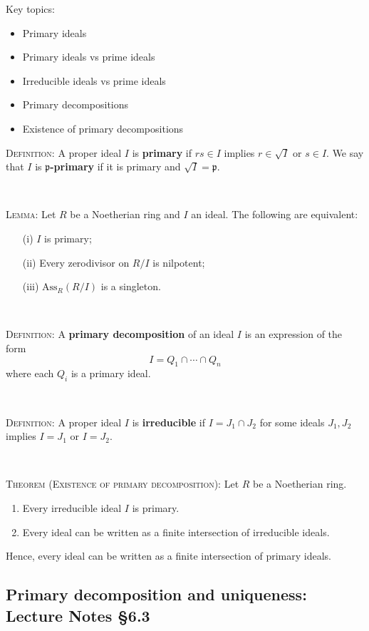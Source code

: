 \documentclass[12pt]{amsart}
\newcommand{\p}{\mathfrak{p}}
\newcommand{\Ass}{\mathrm{Ass}}
\newcommand{\0}{$\phantom{.}$}
\newcommand{\1}{\mathbbm{1}}
\begin{document}
  \begin{framed} Key topics:
\begin{itemize}
\item Primary ideals
\item Primary ideals vs prime ideals
\item Irreducible ideals vs prime ideals
\item Primary decompositions
\item Existence of primary decompositions
\end{itemize}
\end{framed}

\noindent \textsc{Definition:} A proper ideal $I$ is \textbf{primary} if $rs\in I$ implies $r\in \sqrt{I}$ or $s\in I$. We say that $I$ is \textbf{$\p$-primary} if it is primary and $\sqrt{I}=\p$.

\

\noindent \textsc{Lemma:} Let $R$ be a Noetherian ring and $I$ an ideal. The following are equivalent:
\begin{enumerate}
\item[(i)] $I$ is primary;
\item[(ii)] Every zerodivisor on $R/I$ is nilpotent;
\item[(iii)] $\Ass_R(R/I)$ is a singleton.
\end{enumerate}

\


\noindent \textsc{Definition:} A \textbf{primary decomposition} of an ideal $I$ is an expression of the form
\[ I = Q_1 \cap \cdots \cap Q_n\]
where each $Q_i$ is a primary ideal.

\


\noindent \textsc{Definition:} A proper ideal $I$ is \textbf{irreducible} if $I=J_1\cap J_2$ for some ideals $J_1,J_2$ implies $I=J_1$ or $I=J_2$.


\


\noindent \textsc{Theorem (Existence of primary decomposition):} Let $R$ be a Noetherian ring.
\begin{enumerate}
\item Every irreducible ideal $I$ is primary.
\item Every ideal can be written as a finite intersection of irreducible ideals.
\end{enumerate}
Hence, every ideal can be written as a finite intersection of primary ideals.


\newpage

\subsection{Primary decomposition and uniqueness: Lecture Notes \S6.3}\0
 
\end{document}
